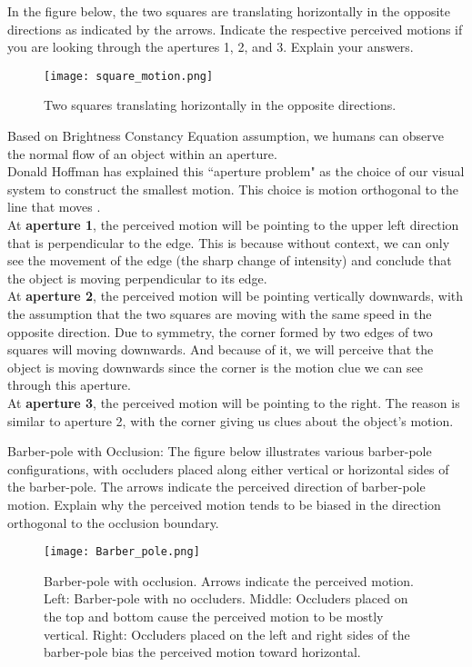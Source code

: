 \begin{questions}
\question
In the figure below, the two squares are translating horizontally in the opposite directions as indicated by the arrows. Indicate the respective perceived motions if you are looking through the apertures 1, 2, and 3. Explain your answers.

\begin{figure}[H]
    \centering
    \texttt{[image: square\_motion.png]}
    \caption{Two squares translating horizontally in the opposite directions.}
\end{figure}

\begin{solution}
    Based on Brightness Constancy Equation assumption, we humans can observe the normal flow of an object within an aperture.\\
    Donald Hoffman has explained this ``aperture problem" as the choice of our visual system to construct the smallest motion. This choice is motion orthogonal to the line that moves \cite{HD}.\\
    At \textbf{aperture 1}, the perceived motion will be pointing to the upper left direction that is perpendicular to the edge. This is because without context, we can only see the movement of the edge (the sharp change of intensity) and conclude that the object is moving perpendicular to its edge.\\
    At \textbf{aperture 2}, the perceived motion will be pointing vertically downwards, with the assumption that the two squares are moving with the same speed in the opposite direction. Due to symmetry, the corner formed by two edges of two squares will moving downwards. And because of it, we will perceive that the object is moving downwards since the corner is the motion clue we can see through this aperture.\\
    At \textbf{aperture 3}, the perceived motion will be pointing to the right. The reason is similar to aperture 2, with the corner giving us clues about the object's motion.
\end{solution}

\question
Barber-pole with Occlusion: The figure below illustrates various barber-pole configurations, with occluders placed along either vertical or horizontal sides of the barber-pole. The arrows indicate the perceived direction of barber-pole motion. Explain why the perceived motion tends to be biased in the direction orthogonal to the occlusion boundary.

\begin{figure}[H]
    \centering
    \texttt{[image: Barber\_pole.png]}
    \caption{Barber-pole with occlusion. Arrows indicate the perceived motion. Left: Barber-pole with no occluders. Middle: Occluders placed on the top and bottom cause the perceived motion to be mostly vertical. Right: Occluders placed on the left and right sides of the barber-pole bias the perceived motion toward horizontal.}
\end{figure}


\end{questions}
